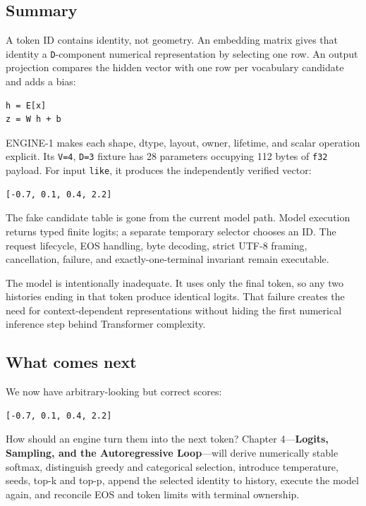 \documentclass[
  10pt,
]{article}
\begin{document}
\subsection{Summary}\label{summary-2}

A token ID contains identity, not geometry. An embedding matrix gives
that identity a \texttt{D}-component numerical representation by
selecting one row. An output projection compares the hidden vector with
one row per vocabulary candidate and adds a bias:

\begin{verbatim}
h = E[x]
z = W h + b
\end{verbatim}

ENGINE-1 makes each shape, dtype, layout, owner, lifetime, and scalar
operation explicit. Its \texttt{V=4}, \texttt{D=3} fixture has 28
parameters occupying 112 bytes of \texttt{f32} payload. For input
\texttt{like}, it produces the independently verified vector:

\begin{verbatim}
[-0.7, 0.1, 0.4, 2.2]
\end{verbatim}

The fake candidate table is gone from the current model path. Model
execution returns typed finite logits; a separate temporary selector
chooses an ID. The request lifecycle, EOS handling, byte decoding,
strict UTF-8 framing, cancellation, failure, and exactly-one-terminal
invariant remain executable.

The model is intentionally inadequate. It uses only the final token, so
any two histories ending in that token produce identical logits. That
failure creates the need for context-dependent representations without
hiding the first numerical inference step behind Transformer complexity.

\subsection{What comes next}\label{what-comes-next}

We now have arbitrary-looking but correct scores:

\begin{verbatim}
[-0.7, 0.1, 0.4, 2.2]
\end{verbatim}

How should an engine turn them into the next token? Chapter
4---\textbf{Logits, Sampling, and the Autoregressive Loop}---will derive
numerically stable softmax, distinguish greedy and categorical
selection, introduce temperature, seeds, top-k and top-p, append the
selected identity to history, execute the model again, and reconcile EOS
and token limits with terminal ownership.
\end{document}
